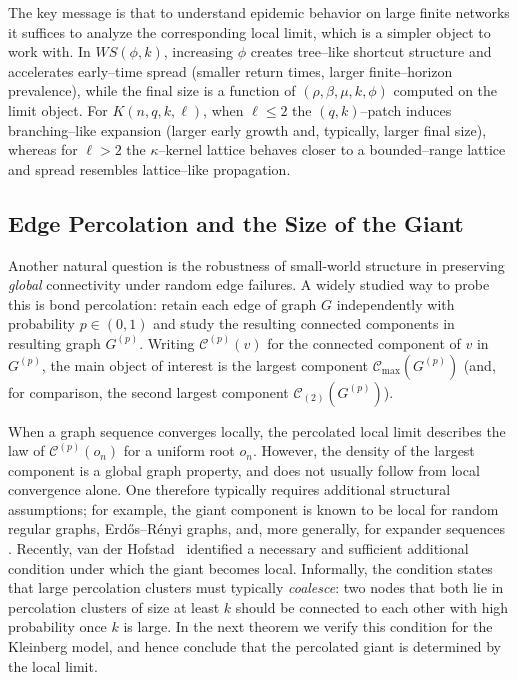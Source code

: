 \documentclass[10pt]{amsart}
\begin{document}
The key message is that to understand epidemic behavior on large finite networks it suffices to analyze the corresponding local limit, which is a simpler object to work with.  In $WS(\phi,k)$, increasing $\phi$ creates tree–like shortcut structure and accelerates early–time spread (smaller return times, larger finite–horizon prevalence), while the final size is a function of $(\rho,\beta,\mu,k,\phi)$ computed on the limit object. For $K(n,q,k,\ell)$, when $\ell\le 2$ the $(q,k)$–patch induces branching–like expansion (larger early growth and, typically, larger final size), whereas for $\ell>2$ the $\kappa$–kernel lattice behaves closer to a bounded–range lattice and spread resembles lattice–like propagation.


\subsection{Edge Percolation and the Size of the Giant}
\label{sec:app-giant-percolation-kleinberg} 
Another natural question is the robustness of small-world structure in preserving \emph{global} connectivity under random edge failures. A widely studied way to probe this is bond percolation: retain each edge of graph $G$ independently with probability $p\in(0,1)$ and study the resulting connected components in resulting graph $G^{(p)}$.  Writing $\mathcal C^{(p)}(v)$ for the connected component of $v$ in $G^{(p)}$, the main object of interest is the largest component $\mathcal C_{\max}(G^{(p)})$ (and, for comparison, the second largest component $\mathcal C_{(2)}(G^{(p)})$).

When a graph sequence converges locally, the percolated local limit describes the law of $\mathcal C^{(p)}(o_n)$ for a uniform root $o_n$. However, the density of the largest component is a global graph property, and does not usually follow from local convergence alone. One therefore typically requires additional structural assumptions; for example, the giant component is known to be local for random regular graphs, Erd\H{o}s--R\'enyi graphs, and, more generally, for expander sequences \cite{yeganeh-digraph, vanderhofstad2023giant, van_der_Hofstad_2025}. Recently, van der Hofstad~\cite{vanderhofstad2023giant} identified a necessary and sufficient additional condition under which the giant becomes local.  Informally, the condition states that large percolation clusters must typically \emph{coalesce}: two nodes that both lie in percolation clusters of size at least $k$ should be connected to each other with high probability once $k$ is large. In the next theorem we verify this condition for the Kleinberg model, and hence conclude that the percolated giant is determined by the local limit.
\end{document}
